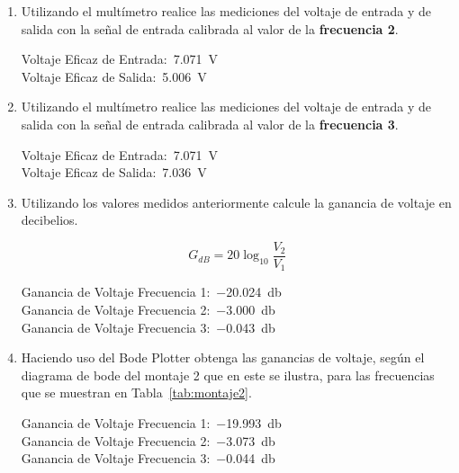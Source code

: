 \documentclass[12pt,a4paper]{article}
\begin{document}
\begin{enumerate}
    \begin{flushright}
        Voltaje Eficaz de Entrada:~\SI{7.071}{\volt}\\
        Voltaje Eficaz de Salida:~\SI{705.161}{\milli\volt}
    \end{flushright}

    \item Utilizando el multímetro realice las mediciones del voltaje de entrada y de salida con la señal de entrada calibrada al valor de la \textbf{frecuencia 2}.
    
    \begin{flushright}
        Voltaje Eficaz de Entrada:~\SI{7.071}{\volt}\\
        Voltaje Eficaz de Salida:~\SI{5.006}{\volt}
    \end{flushright}

    \item Utilizando el multímetro realice las mediciones del voltaje de entrada y de salida con la señal de entrada calibrada al valor de la \textbf{frecuencia 3}.
    
    \begin{flushright}
        Voltaje Eficaz de Entrada:~\SI{7.071}{\volt}\\
        Voltaje Eficaz de Salida:~\SI{7.036}{\volt}
    \end{flushright}

    \item Utilizando los valores medidos anteriormente calcule la ganancia de voltaje en decibelios.
    
    \[
        G_{dB} = 20\log_{10}\frac{V_2}{V_1}
    \]

    \begin{flushright}
        Ganancia de Voltaje Frecuencia 1:~\SI{-20.024}{\decibel}\\
        Ganancia de Voltaje Frecuencia 2:~\SI{-3.000}{\decibel}\\
        Ganancia de Voltaje Frecuencia 3:~\SI{-0.043}{\decibel}
    \end{flushright}

    \item Haciendo uso del Bode Plotter obtenga las ganancias de voltaje, según el diagrama de bode del montaje 2 que en este se ilustra, para las frecuencias que se muestran en Tabla~\ref{tab:montaje2}.
    
    \begin{flushright}
        Ganancia de Voltaje Frecuencia 1:~\SI{-19.993}{\decibel}\\
        Ganancia de Voltaje Frecuencia 2:~\SI{-3.073}{\decibel}\\
        Ganancia de Voltaje Frecuencia 3:~\SI{-0.044}{\decibel}
    \end{flushright}
\end{enumerate}
\end{document}
